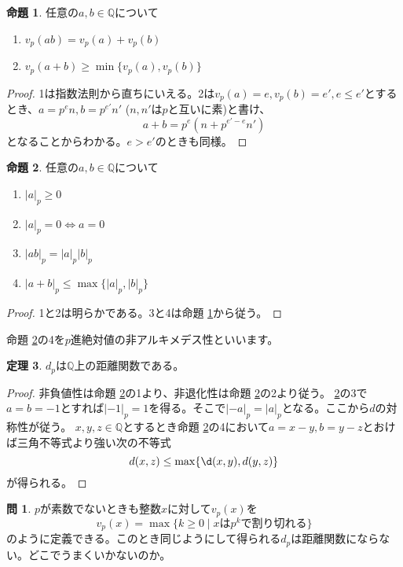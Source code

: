 \documentclass[uplatex]{jsarticle}
\newcommand{\Q}{\mathbb{Q}}
\theoremstyle{definition} %
\newtheorem{thm}{定理}
\newtheorem{prop}[thm]{命題}
\newtheorem*{exercise*}{問}
\begin{document}
\begin{oframed}\begin{prop}\label{prop:1}
任意の$a, b \in \Q$について
\begin{enumerate}
\item $v_p(ab) = v_p(a) + v_p(b)$
\item $v_p(a+b) \geq \min\{v_p(a), v_p(b)\}$
\end{enumerate}
\end{prop}\end{oframed}
\begin{proof}
1は指数法則から直ちにいえる。2は$v_p(a) = e, v_p(b) = e', e \leq e'$とするとき、$a = p^e n, b = p^{e'} n'$ ($n, n'$は$p$と互いに素)と書け、
\[a + b = p^e(n + p^{e'-e} n')\]
となることからわかる。$e > e'$のときも同様。
\end{proof}

\begin{oframed}\begin{prop}\label{prop:2}
任意の$a, b \in \Q$について
\begin{enumerate}
\item $|a|_p \geq 0$
\item $|a|_p = 0 \iff a = 0$
\item $|ab|_p = |a|_p |b|_p$
\item $|a+b|_p \leq \max\{|a|_p, |b|_p\}$
\end{enumerate}
\end{prop}\end{oframed}
\begin{proof}
1と2は明らかである。3と4は命題 \ref{prop:1}から従う。
\end{proof}

命題 \ref{prop:2}の4を$p$進絶対値の非アルキメデス性といいます。

\begin{oframed}\begin{thm}
$d_p$は$\Q$上の距離関数である。
\end{thm}\end{oframed}
\begin{proof}
非負値性は命題 \ref{prop:2}の1より、非退化性は命題 \ref{prop:2}の2より従う。
\ref{prop:2}の3で$a=b=-1$とすれば$|-1|_p = 1$を得る。そこで$|-a|_p = |a|_p$となる。ここから$d$の対称性が従う。
$x, y, z \in \Q$とするとき命題 \ref{prop:2}の4において$a = x - y, b = y - z$とおけば三角不等式より強い次の不等式
\[d(x, z) \leq \max\{\d(x, y), d(y, z)\} \]
が得られる。
\end{proof}

\begin{exercise*}
$p$が素数でないときも整数$x$に対して$v_p(x)$を
\[v_p(x) = \max\{k\geq0\mid xはp^kで割り切れる \}\]
のように定義できる。このとき同じようにして得られる$d_p$は距離関数にならない。どこでうまくいかないのか。
\end{exercise*}
\end{document}
